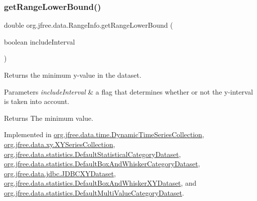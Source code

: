 \mbox{\label{interfaceorg_1_1jfree_1_1data_1_1_range_info_ab0187015bbe75ca00a62a71de72c1a1d}} 
\subsubsection{\texorpdfstring{get\+Range\+Lower\+Bound()}{getRangeLowerBound()}}
{\footnotesize\ttfamily double org.\+jfree.\+data.\+Range\+Info.\+get\+Range\+Lower\+Bound (\begin{DoxyParamCaption}\item[{boolean}]{include\+Interval }\end{DoxyParamCaption})}

Returns the minimum y-\/value in the dataset.


\begin{DoxyParams}{Parameters}
{\em include\+Interval} & a flag that determines whether or not the y-\/interval is taken into account.\\
\hline
\end{DoxyParams}
\begin{DoxyReturn}{Returns}
The minimum value. 
\end{DoxyReturn}


Implemented in \mbox{\hyperlink{classorg_1_1jfree_1_1data_1_1time_1_1_dynamic_time_series_collection_a750bce6796644544dc4a084164e8596d}{org.\+jfree.\+data.\+time.\+Dynamic\+Time\+Series\+Collection}}, \mbox{\hyperlink{classorg_1_1jfree_1_1data_1_1xy_1_1_x_y_series_collection_a7ea06c4bfb1643bfabceb59a89d3360f}{org.\+jfree.\+data.\+xy.\+X\+Y\+Series\+Collection}}, \mbox{\hyperlink{classorg_1_1jfree_1_1data_1_1statistics_1_1_default_statistical_category_dataset_ae20e8ce5b0dfff4b36629d20584e0f20}{org.\+jfree.\+data.\+statistics.\+Default\+Statistical\+Category\+Dataset}}, \mbox{\hyperlink{classorg_1_1jfree_1_1data_1_1statistics_1_1_default_box_and_whisker_category_dataset_a29a3b0a95d9a09ab05cf0063254a5025}{org.\+jfree.\+data.\+statistics.\+Default\+Box\+And\+Whisker\+Category\+Dataset}}, \mbox{\hyperlink{classorg_1_1jfree_1_1data_1_1jdbc_1_1_j_d_b_c_x_y_dataset_a8e50c93deb6df3331819894de3128a64}{org.\+jfree.\+data.\+jdbc.\+J\+D\+B\+C\+X\+Y\+Dataset}}, \mbox{\hyperlink{classorg_1_1jfree_1_1data_1_1statistics_1_1_default_box_and_whisker_x_y_dataset_a08d0eef5b50b12bd52c1c9298a815a3b}{org.\+jfree.\+data.\+statistics.\+Default\+Box\+And\+Whisker\+X\+Y\+Dataset}}, and \mbox{\hyperlink{classorg_1_1jfree_1_1data_1_1statistics_1_1_default_multi_value_category_dataset_aa6e9185318787a0f602019c40b5ea9e7}{org.\+jfree.\+data.\+statistics.\+Default\+Multi\+Value\+Category\+Dataset}}.

